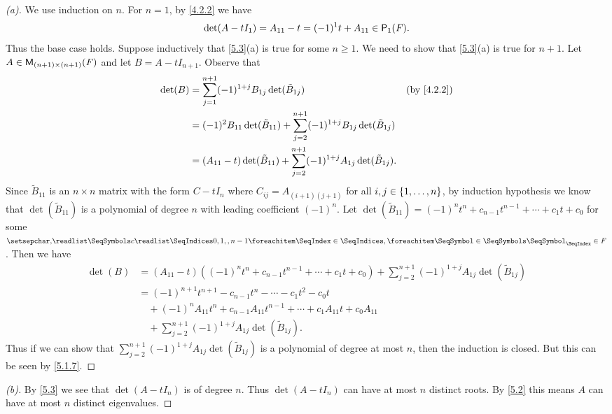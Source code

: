 \begin{proof}[(a)]
	We use induction on \(n\).
	For \(n = 1\), by \cref{4.2.2} we have
	\[
		\det(A - t I_1) = A_{1 1} - t = (-1)^1 t + A_{1 1} \in \ps[1]{\F}.
	\]
	Thus the base case holds.
	Suppose inductively that \cref{5.3}(a) is true for some \(n \geq 1\).
	We need to show that \cref{5.3}(a) is true for \(n + 1\).
	Let \(A \in \ms[(n + 1)][(n + 1)][\F]\) and let \(B = A - t I_{n + 1}\).
	Observe that
	\begin{align*}
		\det(B) & = \sum_{j = 1}^{n + 1} (-1)^{1 + j} B_{1 j} \det(\tilde{B}_{1 j})                                          &  & \by{4.2.2} \\
		        & = (-1)^{2} B_{1 1} \det(\tilde{B}_{1 1}) + \sum_{j = 2}^{n + 1} (-1)^{1 + j} B_{1 j} \det(\tilde{B}_{1 j})                 \\
		        & = (A_{1 1} - t) \det(\tilde{B}_{1 1}) + \sum_{j = 2}^{n + 1} (-1)^{1 + j} A_{1 j} \det(\tilde{B}_{1 j}).
	\end{align*}
	Since \(\tilde{B}_{1 1}\) is an \(n \times n\) matrix with the form \(C - t I_n\) where \(C_{i j} = A_{(i + 1) (j + 1)}\) for all \(i, j \in \left\lbrace1, \dots, n\right\rbrace\), by induction hypothesis we know that \(\det(\tilde{B}_{1 1})\) is a polynomial of degree \(n\) with leading coefficient \((-1)^n\).
	Let \(\det(\tilde{B}_{1 1}) = (-1)^n t^n + c_{n - 1} t^{n - 1} + \cdots + c_1 t + c_0\) for some \(\seq{c}{0,1,,n-1} \in \F\).
	Then we have
	\begin{align*}
		\det(B) & = (A_{1 1} - t) ((-1)^{n} t^n + c_{n - 1} t^{n - 1} + \cdots + c_1 t + c_0) + \sum_{j = 2}^{n + 1} (-1)^{1 + j} A_{1 j} \det(\tilde{B}_{1 j}) \\
		        & = (-1)^{n + 1} t^{n + 1} - c_{n - 1} t^n - \cdots - c_1 t^2 - c_0 t                                                                           \\
		        & \quad + (-1)^n A_{1 1} t^n + c_{n - 1} A_{1 1} t^{n - 1} + \cdots + c_1 A_{1 1} t + c_0 A_{1 1}                                               \\
		        & \quad + \sum_{j = 2}^{n + 1} (-1)^{1 + j} A_{1 j} \det(\tilde{B}_{1 j}).
	\end{align*}
	Thus if we can show that \(\sum_{j = 2}^{n + 1} (-1)^{1 + j} A_{1 j} \det(\tilde{B}_{1 j})\) is a polynomial of degree at most \(n\), then the induction is closed.
	But this can be seen by \cref{5.1.7}.
\end{proof}

\begin{proof}[(b)]
	By \cref{5.3} we see that \(\det(A - t I_n)\) is of degree \(n\).
	Thus \(\det(A - t I_n)\) can have at most \(n\) distinct roots.
	By \cref{5.2} this means \(A\) can have at most \(n\) distinct eigenvalues.
\end{proof}


